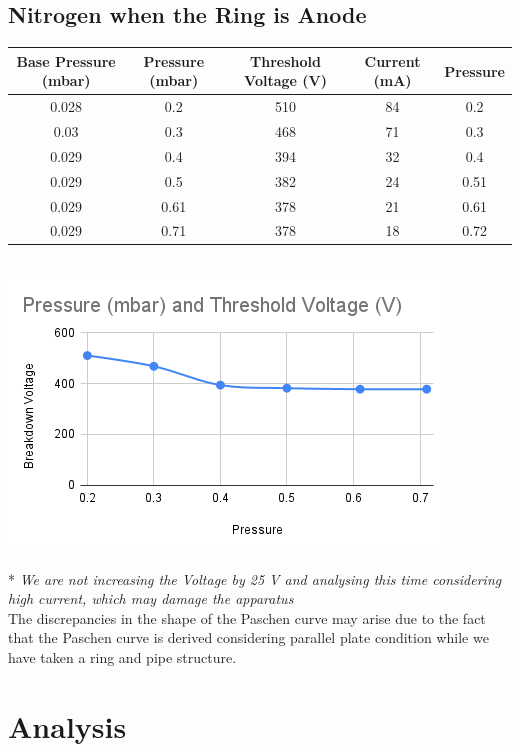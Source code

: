 \documentclass[]{report}[12 pt]
\begin{document}
\subsection{Nitrogen when the Ring is Anode}
\begin{center}
	\begin{tabular}{|c|c|c|c|c|}
		\hline
		Base Pressure (mbar) & Pressure (mbar) & Threshold Voltage (V) & Current (mA) & Pressure \\ \hline
		0.028                & 0.2             & 510                   & 84           & 0.2      \\ \hline
		0.03                 & 0.3             & 468                   & 71           & 0.3      \\ \hline
		0.029                & 0.4             & 394                   & 32           & 0.4      \\ \hline
		0.029                & 0.5             & 382                   & 24           & 0.51     \\ \hline
		0.029                & 0.61            & 378                   & 21           & 0.61     \\ \hline
		0.029                & 0.71            & 378                   & 18           & 0.72     \\ \hline
	\end{tabular}\\
	\includegraphics[width=10 cm]{plasma4.png}
\end{center}


*\textit{ We are not increasing the Voltage by 25 V and analysing this time considering high current, which may damage the apparatus}\\
The discrepancies in the shape of the Paschen curve may arise due to the fact that the Paschen curve is derived considering parallel plate condition while we have taken a ring and pipe structure.
\section{Analysis}
\end{document}
